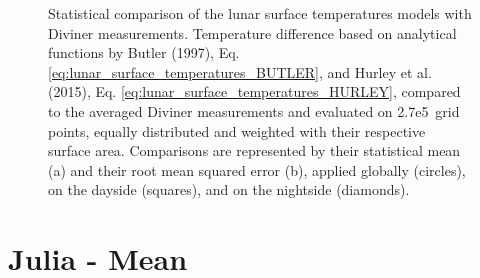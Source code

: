 \documentclass[
    fontsize=10pt,
    twoside=off,
    english,
]{scrbook}
\numberwithin{equation}{chapter}
\theoremstyle{break}
\theoremstyle{nonumberplain}
\begin{document}
\begin{figure}
\begin{minipage}[t]{0.50\linewidth}
{{}

}

\end{minipage}%

\caption{\label{fig-lunar_surface_temperatures_comparison}Statistical
comparison of the lunar surface temperatures models with Diviner
measurements. Temperature difference based on analytical functions by
Butler (1997), Eq. \eqref{eq:lunar_surface_temperatures_BUTLER}, and
Hurley et al. (2015), Eq. \eqref{eq:lunar_surface_temperatures_HURLEY},
compared to the averaged Diviner measurements and evaluated on
2.7e5\,\mathrm{} grid points, equally distributed and weighted with
their respective surface area. Comparisons are represented by their
statistical mean (a) and their root mean squared error (b), applied
globally (circles), on the dayside (squares), and on the nightside
(diamonds).}

\end{figure}

\section{Julia - Mean}
\end{document}
